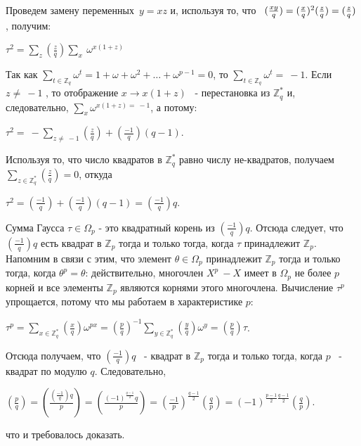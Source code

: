 
\begin{myproof}
Проведем замену переменных~$y = xz$ и, используя то, что ~$(\frac{xy}{q}) = (\frac xq)^2(\frac zq) \\ = (\frac zq) $, получим:
\begin{center}
$\tau^2 = \underset{z}{\sum} (\frac zq) \underset{x}{\sum} \ \omega^{x(1+z)} $
\end{center}
Так как $\sum_{t \in \mathbb{Z}_q} \omega^t = 1 + \omega + \omega^2 + \dots + \omega^{p-1} = 0 $, то $\sum_{t \in \mathbb{Z}_q} \omega^t = ~-1$. Если $z \not=~-1$
, то отображение $x \rightarrow x(1+z) $
 ~- перестановка из $\mathbb{Z}_q^*$
 и, следовательно, $\sum_{x} \omega^{x(1+z) = ~-1}$, а потому:

\begin{center}
$\tau^2 = ~- \underset{z \not= ~-1}{\sum} (\frac zq) + (\frac{-1}{q})(q - 1) $.
\end{center}


Используя то, что число квадратов в $\mathbb{Z}_q^*$
 равно числу не-квадратов, получаем  $\sum_{z \in \mathbb{Z}_q^*} (\frac zq) = 0$, откуда

\begin{center}
$\tau^2 = (\frac{-1}{q}) + (\frac{-1}{q})(q - 1) = (\frac{-1}{q})q $.
\end{center}

\end{myproof}

\begin{thm}
Сумма Гаусса $\tau \in \Omega_p$ - это квадратный корень из $(\frac{-1}{q})q$. Отсюда следует, что $(\frac{-1}{q})q$
 есть квадрат в $\mathbb{Z}_p$
 тогда и только тогда, когда $\tau$
 принадлежит $\mathbb{Z}_p$. Напомним в связи с этим, что элемент $\theta \in \Omega_p$
 принадлежит $\mathbb{Z}_p$
 тогда и только тогда, когда $\theta^p = \theta$: действительно, многочлен $X^p ~- X$
 имеет в $\Omega_p$
 не более $p$ корней и все элементы $\mathbb{Z}_p$
 являются корнями этого многочлена. Вычисление $\tau^p$
 упрощается, потому что мы работаем в характеристике $p$:

\begin{center}
$\tau^p = \underset{x \in \mathbb{Z}_q^*}{\sum} (\frac xq)\omega^{px} = (\frac pq)^{-1} \underset{y \in \mathbb{Z}_q^*}{\sum} (\frac yq)\omega^y = (\frac pq)\tau$.
\end{center}


Отсюда получаем, что $(\frac{-1}{q})q$
 ~- квадрат в $\mathbb{Z}_p$
 тогда и только тогда, когда $p$ ~- квадрат по модулю $q$. Следовательно, 

\begin{center}
$(\frac pq) = (\frac{(\frac{-1}{q})q}{p}) = (\frac{(-1)^{\frac{q-1}{2}}q}{p}) = (\frac{-1}{p})^{\frac{q-1}{2}}(\frac qp) = (-1)^{\frac{p-1}{2}\frac{q-1}{2}} (\frac qp)$.
\end{center}


что и требовалось доказать.
\end{thm}

